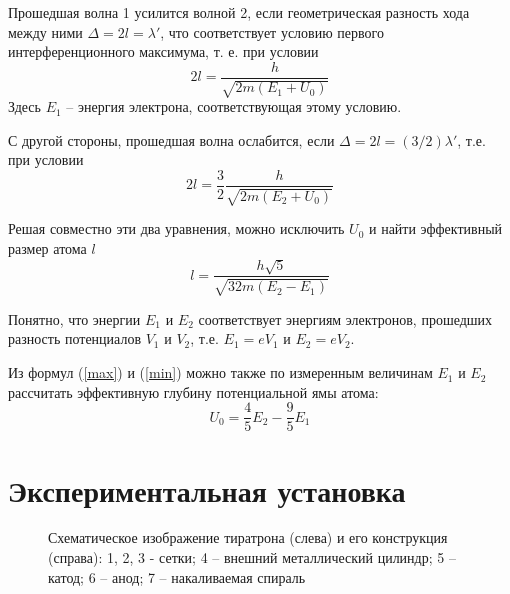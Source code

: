 \documentclass[14pt,a4paper]{scrartcl}
\begin{document}
Прошедшая волна 1 усилится волной 2, если геометрическая разность хода между ними $\Delta = 2l = \lambda'$, что соответствует условию первого интерференционного максимума, т. е. при условии
\begin{equation} \label{max}
2l = \frac{h}{\sqrt{2m(E_1 + U_0)}}
\end{equation}
Здесь $E_1$ -- энергия электрона, соответствующая этому условию.

С другой стороны, прошедшая волна ослабится, если $\Delta = 2l = (3/2)\lambda'$, т.е. при условии 
\begin{equation} \label{min}
2l = \frac{3}{2} \frac{h}{\sqrt{2m(E_2 + U_0)}}
\end{equation}

Решая совместно эти два уравнения, можно исключить $U_0$ и найти эффективный размер атома $l$
\begin{equation} \label{size}
l = \frac{h \sqrt{5}}{\sqrt{32m(E_2 - E_1)}}
\end{equation}

Понятно, что энергии $E_1$ и $E_2$ соответствует энергиям электронов, прошедших разность потенциалов $V_1$ и $V_2$, т.е. $E_1 = eV_1$ и $E_2 = eV_2$. 

Из формул (\ref{max}) и (\ref{min}) можно также по измеренным величинам $E_1$ и $E_2$ рассчитать эффективную глубину потенциальной ямы атома:
\begin{equation} \label{hole}
U_0 = \frac{4}{5} E_2 - \frac{9}{5} E_1
\end{equation}


\section{Экспериментальная установка}

\begin{figure}[ht!]\label{tiratron} 
\caption{Схематическое изображение тиратрона (слева) и его конструкция (справа): 1, 2, 3 - сетки; 4 -- внешний металлический цилиндр; 5 -- катод; 6 -- анод; 7 -- накаливаемая спираль}
\end{figure}
\end{document}

